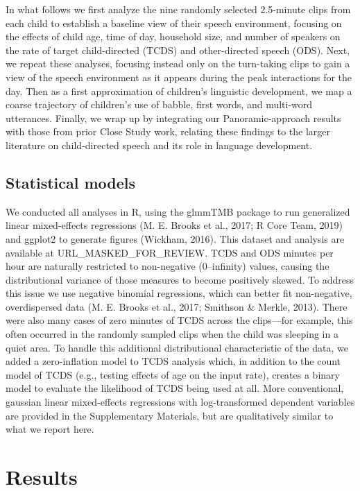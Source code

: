 \documentclass[,man,floatsintext]{apa6}
\begin{document}
In what follows we first analyze the nine randomly selected 2.5-minute
clips from each child to establish a baseline view of their speech
environment, focusing on the effects of child age, time of day,
household size, and number of speakers on the rate of target
child-directed (TCDS) and other-directed speech (ODS). Next, we repeat
these analyses, focusing instead only on the turn-taking clips to gain a
view of the speech environment as it appears during the peak
interactions for the day. Then as a first approximation of children's
linguistic development, we map a coarse trajectory of children's use of
babble, first words, and multi-word utterances. Finally, we wrap up by
integrating our Panoramic-approach results with those from prior Close
Study work, relating these findings to the larger literature on
child-directed speech and its role in language development.

\subsection{Statistical models}\label{statistical-models}

We conducted all analyses in R, using the glmmTMB package to run
generalized linear mixed-effects regressions (M. E. Brooks et al., 2017;
R Core Team, 2019) and ggplot2 to generate figures (Wickham, 2016). This
dataset and analysis are available at URL\_MASKED\_FOR\_REVIEW. TCDS and
ODS minutes per hour are naturally restricted to non-negative
(0--infinity) values, causing the distributional variance of those
measures to become positively skewed. To address this issue we use
negative binomial regressions, which can better fit non-negative,
overdispersed data (M. E. Brooks et al., 2017; Smithson \& Merkle,
2013). There were also many cases of zero minutes of TCDS across the
clips---for example, this often occurred in the randomly sampled clips
when the child was sleeping in a quiet area. To handle this additional
distributional characteristic of the data, we added a zero-inflation
model to TCDS analysis which, in addition to the count model of TCDS
(e.g., testing effects of age on the input rate), creates a binary model
to evaluate the likelihood of TCDS being used at all. More conventional,
gaussian linear mixed-effects regressions with log-transformed dependent
variables are provided in the Supplementary Materials, but are
qualitatively similar to what we report here.

\section{Results}\label{results}
\end{document}
